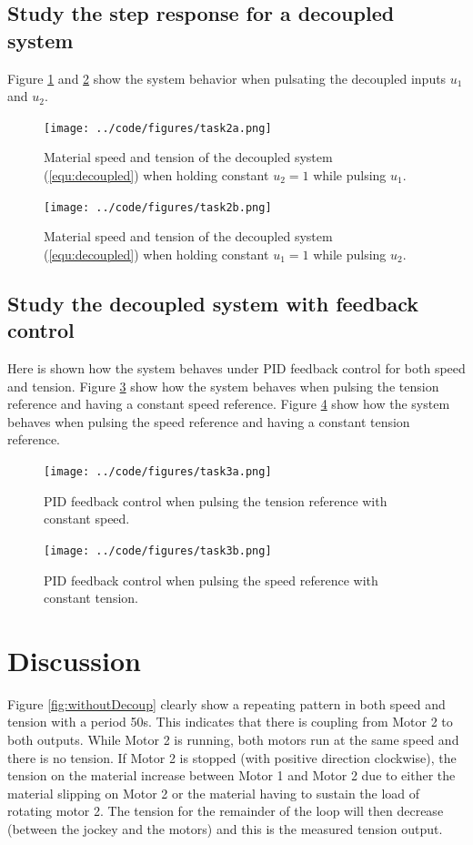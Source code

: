 \documentclass[a4paper, titlepage]{article}
\begin{document}
\subsection{Study the step response for a decoupled system}
Figure \ref{fig:withDecoupSpeedA} and \ref{fig:withDecoupSpeedB} show the system behavior when pulsating the decoupled inputs $u_1$ and $u_2$.

\begin{figure}[H]
\center
\texttt{[image: ../code/figures/task2a.png]}
\caption{Material speed and tension of the decoupled system (\ref{equ:decoupled}) when holding constant $u_2 = 1$ while pulsing $u_1$.}
\label{fig:withDecoupSpeedA}
\end{figure}

\begin{figure}[H]
\center
\texttt{[image: ../code/figures/task2b.png]}
\caption{Material speed and tension of the decoupled system (\ref{equ:decoupled}) when holding constant $u_1 = 1$ while pulsing $u_2$.}
\label{fig:withDecoupSpeedB}
\end{figure}


\subsection{Study the decoupled system with feedback control}
Here is shown how the system behaves under PID feedback control for both speed and tension.
Figure \ref{fig:withFeedbackDecoupSpeedA} show how the system behaves when pulsing the tension reference and having a constant speed reference.
Figure \ref{fig:withFeedbackDecoupSpeedB} show how the system behaves when pulsing the speed reference and having a constant tension reference.

\begin{figure}[H]
\center
\texttt{[image: ../code/figures/task3a.png]}
\caption{PID feedback control when pulsing the tension reference with constant speed.}
\label{fig:withFeedbackDecoupSpeedA}
\end{figure}

\begin{figure}[H]
\center
\texttt{[image: ../code/figures/task3b.png]}
\caption{PID feedback control when pulsing the speed reference with constant tension.}
\label{fig:withFeedbackDecoupSpeedB}
\end{figure}


\section{Discussion}
Figure \ref{fig:withoutDecoup} clearly show a repeating pattern in both speed and tension with a period 50s.
This indicates that there is coupling from Motor 2 to both outputs.
While Motor 2 is running, both motors run at the same speed and there is no tension.
If Motor 2 is stopped (with positive direction clockwise), the tension on the material increase between Motor 1 and Motor 2 due to either the material slipping on Motor 2 or the material having to sustain the load of rotating motor 2.
The tension for the remainder of the loop will then decrease (between the jockey and the motors) and this is the measured tension output.
\end{document}
